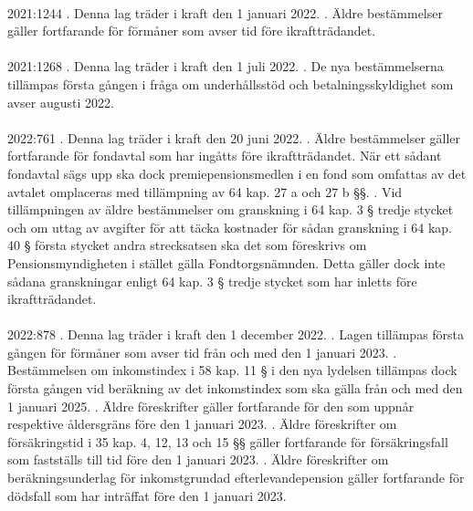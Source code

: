 \documentclass[a4paper,notitlepage,openany,10pt]{book}
\begin{document}
\paragraph*{}
2021:1244
. Denna lag träder i kraft den 1 januari 2022.
. Äldre bestämmelser gäller fortfarande för förmåner som avser tid före ikraftträdandet.
\paragraph*{}
2021:1268
. Denna lag träder i kraft den 1 juli 2022.
. De nya bestämmelserna tillämpas första gången i fråga om underhållsstöd och betalningsskyldighet som avser augusti 2022.
\paragraph*{}
2022:761
. Denna lag träder i kraft den 20 juni 2022.
. Äldre bestämmelser gäller fortfarande för fondavtal som har ingåtts före ikraftträdandet. När ett sådant fondavtal sägs upp ska dock premiepensionsmedlen i en fond som omfattas av det avtalet omplaceras med tillämpning av 64 kap. 27 a och 27 b §§.
. Vid tillämpningen av äldre bestämmelser om granskning i 64 kap. 3 § tredje stycket och om uttag av avgifter för att täcka kostnader för sådan granskning i 64 kap. 40 § första stycket andra strecksatsen ska det som föreskrivs om Pensionsmyndigheten i stället gälla Fondtorgsnämnden. Detta gäller dock inte sådana granskningar enligt 64 kap. 3 § tredje stycket som har inletts före ikraftträdandet.
\paragraph*{}
2022:878
. Denna lag träder i kraft den 1 december 2022.
. Lagen tillämpas första gången för förmåner som avser tid från och med den 1 januari 2023.
. Bestämmelsen om inkomstindex i 58 kap. 11 § i den nya lydelsen tillämpas dock första gången vid beräkning av det inkomstindex som ska gälla från och med den 1 januari 2025.
. Äldre föreskrifter gäller fortfarande för den som uppnår respektive åldersgräns före den 1 januari 2023.
. Äldre föreskrifter om försäkringstid i 35 kap. 4, 12, 13 och 15 §§ gäller fortfarande för försäkringsfall som fastställs till tid före den 1 januari 2023.
. Äldre föreskrifter om beräkningsunderlag för inkomstgrundad efterlevandepension gäller fortfarande för dödsfall som har inträffat före den 1 januari 2023.
\end{document}
